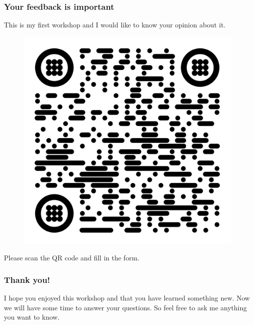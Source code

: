 \documentclass{beamer}
\begin{document}
\begin{frame}
    \frametitle{Your feedback is important}
    \small
    This is my first workshop and I would like to know your opinion about it.
    \begin{figure}

        \includegraphics[width=0.4\linewidth]{qr-github}

        \label{fig:qr-github}

    \end{figure}
    \centering \small Please scan the QR code and fill in the form.
\end{frame}

\begin{frame}
    \frametitle{Thank you!}
    \small
    I hope you enjoyed this workshop and that you have learned something new.
    \newline
    \newline
    Now we will have some time to answer your questions.
    \newline
    \newline
    So feel free to ask me anything you want to know.
\end{frame}
\end{document}

